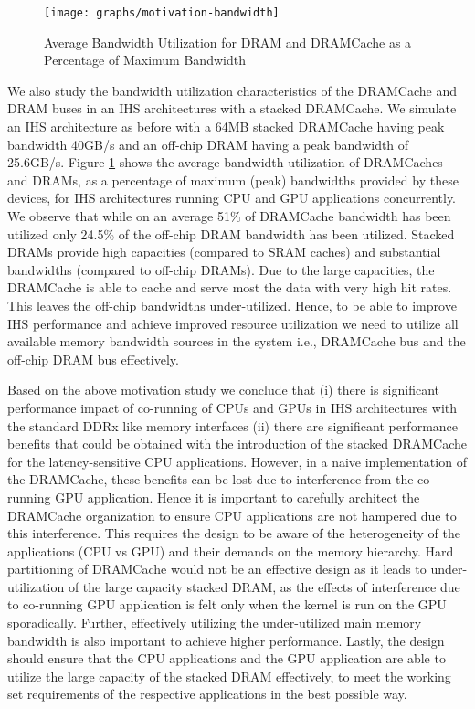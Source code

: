\begin{figure}[htb]
	\centering
	\texttt{[image: graphs/motivation-bandwidth]}
	\caption{Average Bandwidth Utilization for DRAM and DRAMCache as a Percentage of Maximum Bandwidth}
	\label{fig:motivation-banwdidth}
\end{figure}

\par We also study the bandwidth utilization characteristics of the DRAMCache and DRAM buses in an IHS architectures with a stacked DRAMCache. We simulate an IHS architecture as before with a 64MB stacked DRAMCache having peak bandwidth 40GB/s and an off-chip DRAM having a peak bandwidth of 25.6GB/s. Figure \ref{fig:motivation-banwdidth} shows the average bandwidth utilization of DRAMCaches and DRAMs, as a percentage of maximum (peak) bandwidths provided by these devices, for IHS architectures running CPU and GPU applications concurrently. We observe that while on an average 51\% of DRAMCache bandwidth has been utilized only 24.5\% of the off-chip DRAM bandwidth has been utilized. Stacked DRAMs provide high capacities (compared to SRAM caches) and substantial bandwidths (compared to off-chip DRAMs). Due to the large capacities, the DRAMCache is able to cache and serve most the data with very high hit rates. This leaves the off-chip bandwidths under-utilized. Hence, to be able to improve IHS performance and achieve improved resource utilization we need to utilize all available memory bandwidth sources in the system i.e., DRAMCache bus and the off-chip DRAM bus effectively.

\par Based on the above motivation study we conclude that (i) there is significant performance impact of co-running of CPUs and GPUs in IHS architectures with the standard DDRx like memory interfaces (ii) there are significant performance benefits that could be obtained 
with the introduction of the stacked DRAMCache for the latency-sensitive CPU applications. However, in a naive implementation
of the DRAMCache, these benefits can be lost due to interference from the co-running GPU application.  Hence it is important to carefully 
architect the DRAMCache organization to ensure CPU applications are not hampered due to this interference.
This requires the design to be aware of the heterogeneity of the applications (CPU vs GPU) and their demands on the 
memory hierarchy.  Hard partitioning of DRAMCache would not be an effective design as it leads to under-utilization of the large capacity 
stacked DRAM, as the effects of interference due to co-running GPU application is felt only when the kernel is run on the GPU sporadically. 
Further, effectively utilizing the under-utilized main memory bandwidth \cite{micro-refresh, mainak-hpca, bear}
is also important to achieve higher performance.  Lastly, the design should ensure that the CPU applications and the 
GPU application are able to utilize the large capacity of the stacked DRAM effectively, to meet the working set 
requirements of the respective applications in the best possible way.

